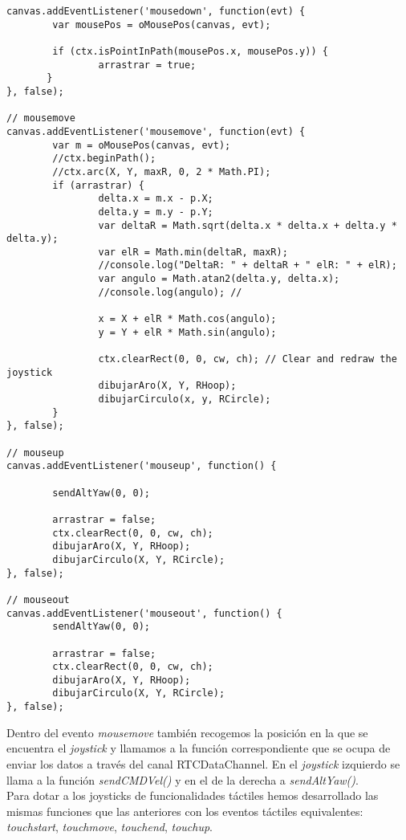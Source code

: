 \begin{lstlisting}[caption=Movimiento y control del joystick.]
canvas.addEventListener('mousedown', function(evt) {
        var mousePos = oMousePos(canvas, evt);

        if (ctx.isPointInPath(mousePos.x, mousePos.y)) {
                arrastrar = true;
       }
}, false);

// mousemove 
canvas.addEventListener('mousemove', function(evt) {
        var m = oMousePos(canvas, evt);
        //ctx.beginPath();
        //ctx.arc(X, Y, maxR, 0, 2 * Math.PI);
        if (arrastrar) {
                delta.x = m.x - p.X;
                delta.y = m.y - p.Y;
                var deltaR = Math.sqrt(delta.x * delta.x + delta.y * delta.y);
                var elR = Math.min(deltaR, maxR);
                //console.log("DeltaR: " + deltaR + " elR: " + elR);
                var angulo = Math.atan2(delta.y, delta.x);
                //console.log(angulo); //
                
                x = X + elR * Math.cos(angulo);
                y = Y + elR * Math.sin(angulo);
                
                ctx.clearRect(0, 0, cw, ch); // Clear and redraw the joystick
                dibujarAro(X, Y, RHoop);
                dibujarCirculo(x, y, RCircle);
        }
}, false);

// mouseup 
canvas.addEventListener('mouseup', function() {
        
        sendAltYaw(0, 0);
        
        arrastrar = false;
        ctx.clearRect(0, 0, cw, ch);
        dibujarAro(X, Y, RHoop);
        dibujarCirculo(X, Y, RCircle);
}, false);

// mouseout 
canvas.addEventListener('mouseout', function() {
        sendAltYaw(0, 0);
        
        arrastrar = false;
        ctx.clearRect(0, 0, cw, ch);
        dibujarAro(X, Y, RHoop);
        dibujarCirculo(X, Y, RCircle);
}, false);
\end{lstlisting}

Dentro del evento \emph{mousemove} también recogemos la posición en la que se encuentra el \emph{joystick} y llamamos a la función correspondiente que se ocupa de enviar los datos a través del canal RTCDataChannel. En el \emph{joystick} izquierdo se llama a la función \emph{sendCMDVel()} y en el de la derecha a \emph{sendAltYaw()}.\\

Para dotar a los joysticks de funcionalidades táctiles hemos desarrollado las mismas funciones que las anteriores con los eventos táctiles equivalentes: \emph{touchstart}, \emph{touchmove}, \emph{touchend}, \emph{touchup}.\\

